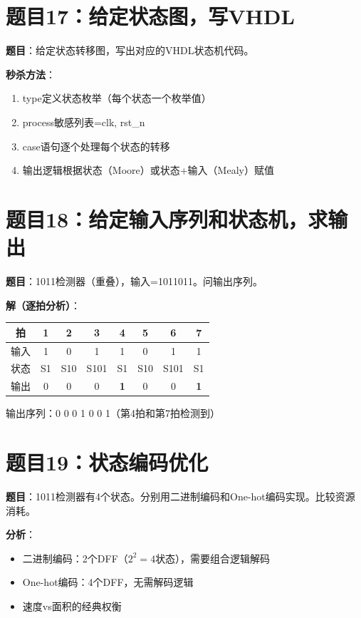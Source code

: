 \section*{题目17：给定状态图，写VHDL}

\textbf{题目}：给定状态转移图，写出对应的VHDL状态机代码。

\textbf{秒杀方法}：
\begin{enumerate}
  \item type定义状态枚举（每个状态一个枚举值）
  \item process敏感列表=clk, rst_n
  \item case语句逐个处理每个状态的转移
  \item 输出逻辑根据状态（Moore）或状态+输入（Mealy）赋值
\end{enumerate}

\section*{题目18：给定输入序列和状态机，求输出}

\textbf{题目}：1011检测器（重叠），输入=1011011。问输出序列。

\textbf{解（逐拍分析）}：
\begin{center}
\begin{tabular}{|c|c|c|c|c|c|c|c|}
\hline
拍 & 1 & 2 & 3 & 4 & 5 & 6 & 7 \\
\hline
输入 & 1 & 0 & 1 & 1 & 0 & 1 & 1 \\
状态 & S1 & S10 & S101 & S1 & S10 & S101 & S1 \\
输出 & 0 & 0 & 0 & \textbf{1} & 0 & 0 & \textbf{1} \\
\hline
\end{tabular}
\end{center}

输出序列：0 0 0 1 0 0 1（第4拍和第7拍检测到）

\section*{题目19：状态编码优化}

\textbf{题目}：1011检测器有4个状态。分别用二进制编码和One-hot编码实现。比较资源消耗。

\textbf{分析}：
\begin{itemize}
  \item 二进制编码：2个DFF（$2^2=4$状态），需要组合逻辑解码
  \item One-hot编码：4个DFF，无需解码逻辑
  \item 速度vs面积的经典权衡
\end{itemize}

